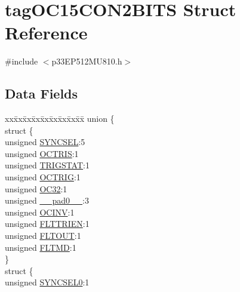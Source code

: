\hypertarget{structtag_o_c15_c_o_n2_b_i_t_s}{}\section{tag\+O\+C15\+C\+O\+N2\+B\+I\+TS Struct Reference}
\label{structtag_o_c15_c_o_n2_b_i_t_s}


{\ttfamily \#include $<$p33\+E\+P512\+M\+U810.\+h$>$}

\subsection*{Data Fields}
\begin{DoxyCompactItemize}
\item 
\begin{tabbing}
xx\=xx\=xx\=xx\=xx\=xx\=xx\=xx\=xx\=\kill
union \{\\
\>struct \{\\
\>\>unsigned \hyperlink{structtag_o_c15_c_o_n2_b_i_t_s_a35fbbe11485c2615ed27535b62c3fa35}{SYNCSEL}:5\\
\>\>unsigned \hyperlink{structtag_o_c15_c_o_n2_b_i_t_s_ab849a74c6179282ed6b06cc047c80544}{OCTRIS}:1\\
\>\>unsigned \hyperlink{structtag_o_c15_c_o_n2_b_i_t_s_ab379549de54ac93ad4aa73686c34cb7c}{TRIGSTAT}:1\\
\>\>unsigned \hyperlink{structtag_o_c15_c_o_n2_b_i_t_s_a8d2cf9b996ef2b9079defa8950de798c}{OCTRIG}:1\\
\>\>unsigned \hyperlink{structtag_o_c15_c_o_n2_b_i_t_s_af52e127483a703e0fa84c7d4f1de0df4}{OC32}:1\\
\>\>unsigned \hyperlink{structtag_o_c15_c_o_n2_b_i_t_s_adf71f3d8410c1f1dbbc96680a92c49af}{\_\_pad0\_\_}:3\\
\>\>unsigned \hyperlink{structtag_o_c15_c_o_n2_b_i_t_s_a301004fca40c8d19d418866c92c19a06}{OCINV}:1\\
\>\>unsigned \hyperlink{structtag_o_c15_c_o_n2_b_i_t_s_ab979b75e02643aa840fb6ee50e0c30fa}{FLTTRIEN}:1\\
\>\>unsigned \hyperlink{structtag_o_c15_c_o_n2_b_i_t_s_ae466664b094d9c830e9ce20b86d7907f}{FLTOUT}:1\\
\>\>unsigned \hyperlink{structtag_o_c15_c_o_n2_b_i_t_s_a245ca3019d6c6ccbfb09f1c821146bb5}{FLTMD}:1\\
\>\} \\
\>struct \{\\
\>\>unsigned \hyperlink{structtag_o_c15_c_o_n2_b_i_t_s_a3b5df3154fde5141e6ac0156425ff8b4}{SYNCSEL0}:1\\

\end{tabbing}
\end{DoxyCompactItemize}
